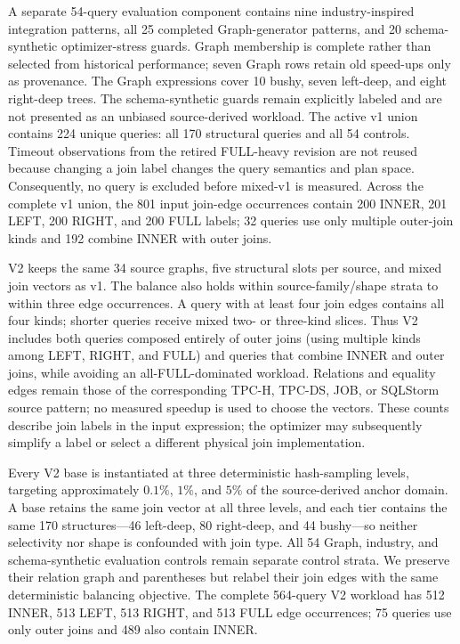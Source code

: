 A separate 54-query evaluation component contains nine industry-inspired
integration patterns, all 25 completed Graph-generator patterns, and 20
schema-synthetic optimizer-stress guards. Graph membership is complete rather
than selected from historical performance; seven Graph rows retain old
speed-ups only as provenance. The Graph expressions cover 10 bushy, seven
left-deep, and eight right-deep trees. The schema-synthetic guards remain
explicitly labeled and are not presented as an unbiased source-derived
workload. The active v1 union contains 224 unique queries: all 170 structural
queries and all 54 controls. Timeout observations from the retired FULL-heavy revision are not
reused because changing a join label changes the query semantics and plan
space. Consequently, no query is excluded before mixed-v1 is measured.
Across the complete v1 union, the 801 input join-edge occurrences contain 200
INNER, 201 LEFT, 200 RIGHT, and 200 FULL labels; 32 queries use only multiple
outer-join kinds and 192 combine INNER with outer joins.

V2 keeps the same 34 source graphs, five structural slots per source, and mixed
join vectors as v1. The balance also
holds within source-family/shape strata to within three edge occurrences. A
query with at least four join edges contains all four kinds; shorter queries
receive mixed two- or three-kind slices. Thus V2 includes both queries composed
entirely of outer joins (using multiple kinds among LEFT, RIGHT, and FULL) and
queries that combine INNER and outer joins, while avoiding an all-FULL-dominated
workload. Relations and equality edges remain those of the corresponding
TPC-H, TPC-DS, JOB, or SQLStorm source pattern; no measured speedup is used to
choose the vectors. These counts describe join labels in the input expression;
the optimizer may subsequently simplify a label or select a different physical
join implementation.

Every V2 base is instantiated at three deterministic hash-sampling levels,
targeting approximately $0.1\%$, $1\%$, and $5\%$ of the source-derived anchor
domain. A base retains the same join vector at all three levels, and each tier
contains the same 170 structures---46 left-deep, 80 right-deep, and 44
bushy---so neither selectivity nor shape is confounded with join type. All 54
Graph, industry, and schema-synthetic evaluation controls remain separate
control strata. We preserve their relation graph and parentheses but relabel
their join edges with the same deterministic balancing objective. The complete
564-query V2 workload has 512 INNER, 513 LEFT, 513 RIGHT, and 513 FULL edge
occurrences; 75 queries use only outer joins and 489 also contain INNER.

